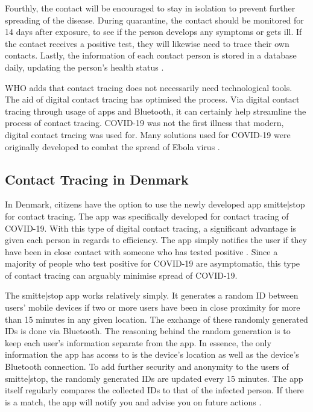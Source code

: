Fourthly, the contact will be encouraged to stay in isolation to prevent further spreading of the disease. During quarantine, the contact should be monitored for 14 days after exposure, to see if the person develops any symptoms or gets ill. If the contact receives a positive test, they will likewise need to trace their own contacts. Lastly, the information of each contact person is stored in a database daily, updating the person's health status \citep{who_headquarters_coronavirus_2020}.

WHO adds that contact tracing does not necessarily need technological tools. The aid of digital contact tracing has optimised the process. Via digital contact tracing through usage of apps and Bluetooth, it can certainly help streamline the process of contact tracing. COVID-19 was not the first illness that modern, digital contact tracing was used for. Many solutions used for COVID-19 were originally developed to combat the spread of Ebola virus \citep{who_headquarters_coronavirus_2020}.

\subsection{Contact Tracing in Denmark} \label{Contact Tracing in Denmark}

In Denmark, citizens have the option to use the newly developed app smitte|stop for contact tracing. The app was specifically developed for contact tracing of COVID-19. With this type of digital contact tracing, a significant advantage is given each person in regards to efficiency. The app simply notifies the user if they have been in close contact with someone who has tested positive \citep{smittestop_smittestop-app_nodate}. Since a majority of people who test positive for COVID-19 are asymptomatic, this type of contact tracing can arguably minimise spread of COVID-19.

The smitte|stop app works relatively simply. It generates a random ID between users' mobile devices if two or more users have been in close proximity for more than 15 minutes in any given location. The exchange of these randomly generated IDs is done via Bluetooth. The reasoning behind the random generation is to keep each user's information separate from the app. In essence, the only information the app has access to is the device's location as well as the device's Bluetooth connection. To add further security and anonymity to the users of smitte|stop, the randomly generated IDs are updated every 15 minutes. The app itself regularly compares the collected IDs to that of the infected person. If there is a match, the app will notify you and advise you on future actions \citep{smittestopdk_download_nodate}.

